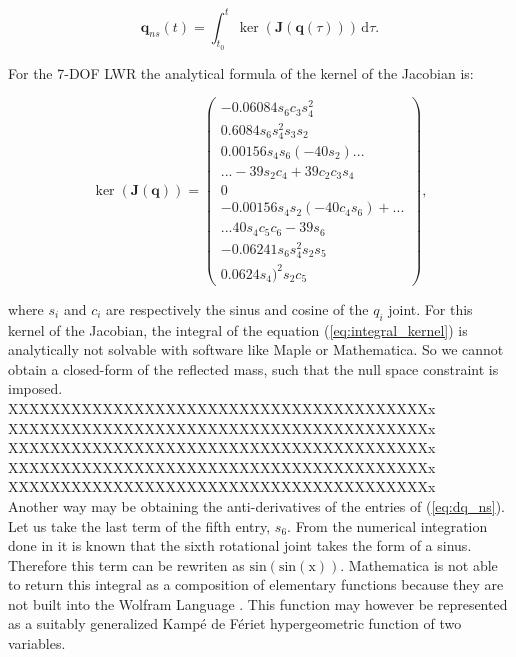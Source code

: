 \begin{equation}
\mathbf{q}_{ns}(t) = \int_{t_0}^t \! \ker(\mathbf{J}(\mathbf{q}(\tau))) \, \mathrm{d}\tau. 
\label{eq:integral_kernel}
\end{equation}

For the 7-DOF LWR the analytical formula of the kernel of the Jacobian is:

\begin{equation}
\ker(\mathbf{J}(\mathbf{q}))  =\begin{pmatrix} -0.06084s_6 c_3 s_4^2\\
0. 6084s_6 s_4^2 s_3 s_2\\
0.00156s_4 s_6 (-40s_2)...\\
...-39s_2 c_4 +39c_2 c_3 s_4\\
0\\
-0.00156s_4 s_2 (-40c_4 s_6)+...\\
...40s_4 c_5 c_6 -39s_6\\
-0.06241s_6 s_4^2 s_2 s_5\\
0.0624s_4)^2 s_2 c_5	
\end{pmatrix}	,
\label{eq:dq_ns}
\end{equation}


where $s_i$ and $c_i$ are respectively the sinus and cosine of the $q_i$ joint. For this kernel of the Jacobian, the integral of the equation (\ref{eq:integral_kernel}) is analytically not solvable with software like Maple or Mathematica. So we cannot obtain a closed-form of the reflected mass, such that the null space constraint is imposed.\\

XXXXXXXXXXXXXXXXXXXXXXXXXXXXXXXXXXXXXXXXx \\
XXXXXXXXXXXXXXXXXXXXXXXXXXXXXXXXXXXXXXXXx \\
XXXXXXXXXXXXXXXXXXXXXXXXXXXXXXXXXXXXXXXXx \\
XXXXXXXXXXXXXXXXXXXXXXXXXXXXXXXXXXXXXXXXx \\
XXXXXXXXXXXXXXXXXXXXXXXXXXXXXXXXXXXXXXXXx \\

Another way may be obtaining the anti-derivatives of the entries of (\ref{eq:dq_ns}). Let us take the last term of the fifth entry, $s_6$. From the numerical integration done in  \cite{fabianthesis} it is known that the sixth rotational joint takes the form of a sinus. Therefore this term can be rewriten as $\mathrm{sin(sin(x))}$.  
Mathematica is not able to return this integral as a composition of elementary functions because they are not built into the Wolfram Language \cite{wolfram}. This function may however be represented as a suitably generalized Kampé de Fériet hypergeometric function \cite{kampe} of two variables.
 
